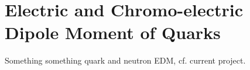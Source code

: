 \chapter{Electric and Chromo-electric Dipole Moment of Quarks}
\label{ch:quark(C)EDM}
Something something quark and neutron EDM, cf. current project.